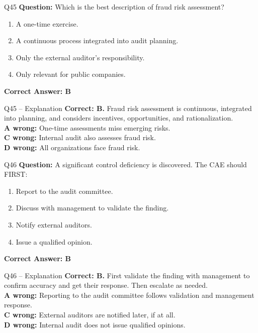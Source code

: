 \documentclass[aspectratio=169,10pt]{beamer}
\begin{document}
	\begin{frame}[t]{Q45}
		\small
		\textbf{Question:} Which is the best description of fraud risk assessment?
		\begin{enumerate}[label=\Alph*.,itemsep=1pt,topsep=2pt]
			\item A one-time exercise.
			\item A continuous process integrated into audit planning.
			\item Only the external auditor's responsibility.
			\item Only relevant for public companies.
		\end{enumerate}
		\vspace{4pt}
		\textbf{Correct Answer: B}
	\end{frame}
	
	\begin{frame}[t]{Q45 -- Explanation}
		\small
		\textbf{Correct: B.} Fraud risk assessment is continuous, integrated into planning, and considers incentives, opportunities, and rationalization. \\[4pt]
		\textbf{A wrong:} One-time assessments miss emerging risks. \\[2pt]
		\textbf{C wrong:} Internal audit also assesses fraud risk. \\[2pt]
		\textbf{D wrong:} All organizations face fraud risk.
	\end{frame}
	
	\begin{frame}[t]{Q46}
		\small
		\textbf{Question:} A significant control deficiency is discovered. The CAE should FIRST:
		\begin{enumerate}[label=\Alph*.,itemsep=1pt,topsep=2pt]
			\item Report to the audit committee.
			\item Discuss with management to validate the finding.
			\item Notify external auditors.
			\item Issue a qualified opinion.
		\end{enumerate}
		\vspace{4pt}
		\textbf{Correct Answer: B}
	\end{frame}
	
	\begin{frame}[t]{Q46 -- Explanation}
		\small
		\textbf{Correct: B.} First validate the finding with management to confirm accuracy and get their response. Then escalate as needed. \\[4pt]
		\textbf{A wrong:} Reporting to the audit committee follows validation and management response. \\[2pt]
		\textbf{C wrong:} External auditors are notified later, if at all. \\[2pt]
		\textbf{D wrong:} Internal audit does not issue qualified opinions.
	\end{frame}
	
\end{document}
